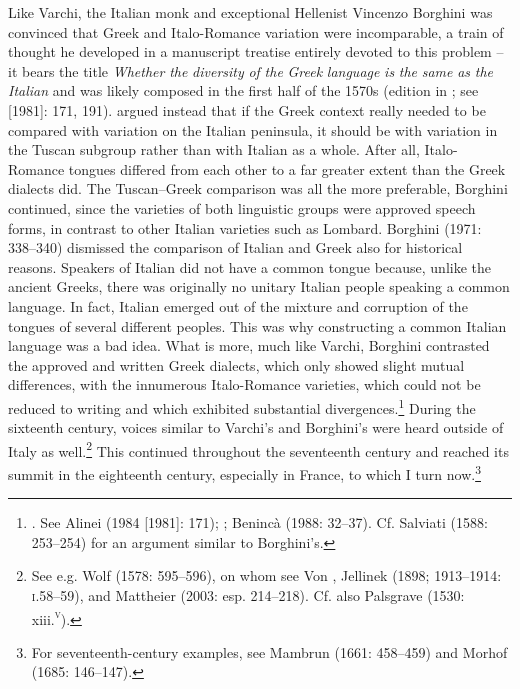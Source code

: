 Like Varchi, the Italian monk and exceptional Hellenist Vincenzo Borghini was convinced that Greek and Italo-Romance variation were incomparable, a train of thought he developed in a manuscript treatise entirely devoted to this problem – it bears the title \textit{Whether} \textit{the} \textit{diversity} \textit{of} \textit{the} \textit{Greek} \textit{language} \textit{is} \textit{the} \textit{same} \textit{as} \textit{the} \textit{Italian} and was likely composed in the first half of the 1570s (edition in \citealt{Borghini1971}; see \citealt{Alinei1984} [1981]: 171, 191). \citet[335]{Borghini1971} argued instead that if the Greek context really needed to be compared with variation on the Italian peninsula, it should be with variation in the Tuscan subgroup rather than with Italian as a whole. After all, Italo-Romance tongues differed from each other to a far greater extent than the Greek dialects did. The Tuscan–Greek comparison was all the more preferable, Borghini continued, since the varieties of both linguistic groups were approved speech forms, in contrast to other Italian varieties such as Lombard. Borghini (1971: 338–340) dismissed the comparison of Italian and Greek also for historical reasons. Speakers of Italian did not have a common tongue because, unlike the ancient Greeks, there was originally no unitary Italian people speaking a common language. In fact, Italian emerged out of the mixture and corruption of the tongues of several different peoples. This was why constructing a common Italian language was a bad idea. What is more, much like Varchi, Borghini contrasted the approved and written Greek dialects, which only showed slight mutual differences, with the innumerous Italo-Romance varieties, which could not be reduced to writing and which exhibited substantial divergences.\footnote{\citet[341]{Borghini1971}. See Alinei (1984 [1981]: 171); \citet[210]{Trovato1984}; Benincà (1988: 32–37). Cf. Salviati (1588: 253–254) for an argument similar to Borghini’s.} During the sixteenth century, voices similar to Varchi’s and Borghini’s were heard outside of Italy as well.\footnote{See e.g. Wolf (1578: 595–596), on whom see Von \citet{Raumer1856}, Jellinek (1898; 1913–1914: \textsc{i}.58–59), and Mattheier (2003: esp. 214–218). Cf. also Palsgrave (1530: xiii.\textsc{\textsuperscript{v}}).} This continued throughout the seventeenth century and reached its summit in the eighteenth century, especially in France, to which I turn now.\footnote{For seventeenth-century examples, see Mambrun (1661: 458–459) and Morhof (1685: 146–147).}

